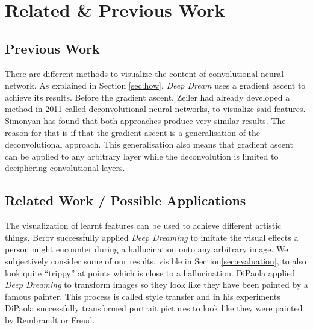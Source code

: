 \section{Related \& Previous Work}
\label{sec:previous-work}
\subsection{Previous Work}
There are different methods to visualize the content of convolutional neural network.
As explained in Section \ref{sec:how}, \textit{Deep Dream} uses a gradient ascent to achieve its results.
Before the gradient ascent, Zeiler had already developed a method in 2011 called deconvolutional neural networks, to visualize said features\cite{zeiler2011adaptive}.
Simonyan has found that both approaches produce very similar results\cite{simonyan2013deep}.
The reason for that is if that the gradient ascent is a generalisation of the deconvolutional approach.
This generalisation also means that gradient ascent can be applied to any arbitrary layer while the deconvolution is limited to deciphering convolutional layers\cite{simonyan2013deep}.

\subsection{Related Work / Possible Applications}
The visualization of learnt features can be used to achieve different artistic things.
Berov successfully applied \textit{Deep Dreaming} to imitate the visual effects a person might encounter during a hallucination onto any arbitrary image\cite{berov2016visual}.
We subjectively consider some of our results, visible in Section\ref{sec:evaluation}, to also look quite \enquote{trippy} at points which is close to a hallucination.
DiPaola applied \textit{Deep Dreaming} to transform images so they look like they have been painted by a famous painter\cite{dipaola2016using}.
This process is called style transfer and in his experiments DiPaola successfully transformed portrait pictures to look like they were painted by Rembrandt or Freud.


